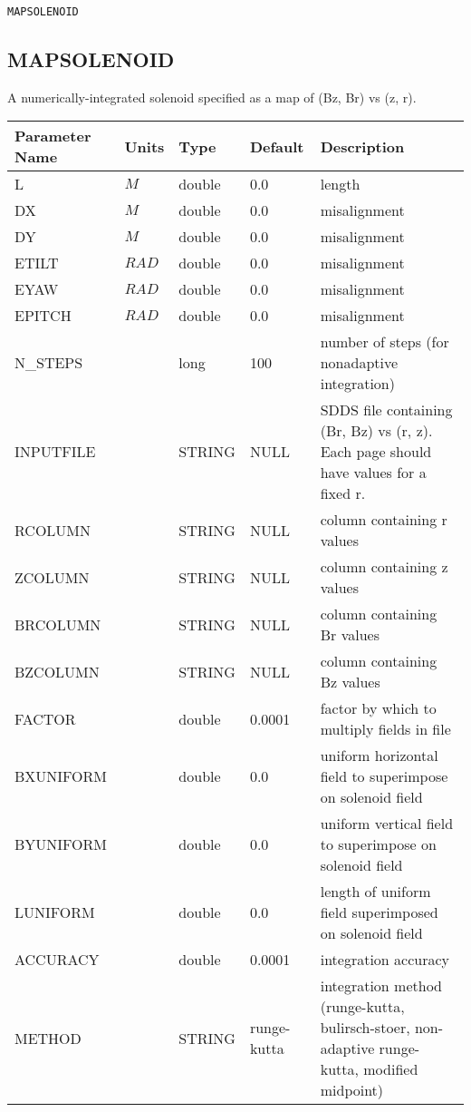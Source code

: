 \begin{latexonly}
\newpage
\begin{center}{\Large\verb|MAPSOLENOID|}\end{center}
\end{latexonly}\subsection{MAPSOLENOID}
A numerically-integrated solenoid specified as a map of (Bz, Br) vs (z, r).
\\
\begin{tabular}{|l|l|l|l|p{\descwidth}|} \hline
Parameter Name & Units & Type & Default & Description \\ \hline 
L & $M$ & double &  0.0 & length  \\ \hline 
DX & $M$ & double &  0.0 & misalignment  \\ \hline 
DY & $M$ & double &  0.0 & misalignment  \\ \hline 
ETILT & $RAD$ & double &  0.0 & misalignment  \\ \hline 
EYAW & $RAD$ & double &  0.0 & misalignment  \\ \hline 
EPITCH & $RAD$ & double &  0.0 & misalignment  \\ \hline 
N\_STEPS &  & long &   100             & number of steps (for nonadaptive integration)  \\ \hline 
INPUTFILE &  & STRING &   NULL            & SDDS file containing (Br, Bz) vs (r, z).  Each page should have values for a fixed r.  \\ \hline 
RCOLUMN &  & STRING &   NULL            & column containing r values  \\ \hline 
ZCOLUMN &  & STRING &   NULL            & column containing z values  \\ \hline 
BRCOLUMN &  & STRING &   NULL            & column containing Br values  \\ \hline 
BZCOLUMN &  & STRING &   NULL            & column containing Bz values  \\ \hline 
FACTOR &  & double &   0.0001 & factor by which to multiply fields in file  \\ \hline 
BXUNIFORM &  & double &  0.0 & uniform horizontal field to superimpose on solenoid field  \\ \hline 
BYUNIFORM &  & double &  0.0 & uniform vertical field to superimpose on solenoid field  \\ \hline 
LUNIFORM &  & double &  0.0 & length of uniform field superimposed on solenoid field  \\ \hline 
ACCURACY &  & double &   0.0001 & integration accuracy  \\ \hline 
METHOD & $ $ & STRING &   runge-kutta     & integration method (runge-kutta, bulirsch-stoer, non-adaptive runge-kutta, modified midpoint)  \\ \hline 
\end{tabular}

